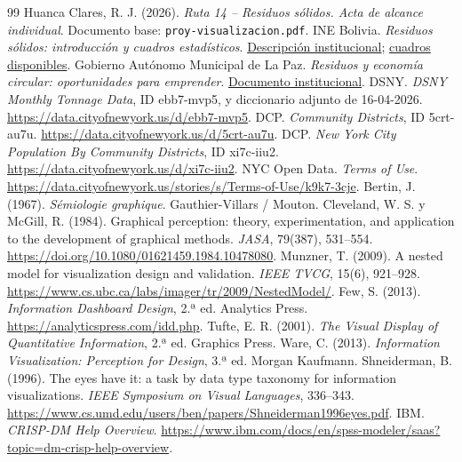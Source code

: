 \documentclass[10pt,a4paper]{article}
\newcommand{\archivo}[1]{\nolinkurl{#1}}
\begin{document}
\newpage
\small
\begin{thebibliography}{99}
\setlength{\itemsep}{3pt}
 Huanca Clares, R. J. (2026). \textit{Ruta 14 -- Residuos sólidos. Acta de alcance individual}. Documento base: \archivo{proy-visualizacion.pdf}.
 INE Bolivia. \textit{Residuos sólidos: introducción y cuadros estadísticos}. \href{https://www.ine.gob.bo/index.php/medio-ambiente/residuos-solidos-introduccion/}{Descripción institucional}; \href{https://www.ine.gob.bo/index.php/medio-ambiente/residuos-solidos-cuadros-estadisticos/}{cuadros disponibles}.
 Gobierno Autónomo Municipal de La Paz. \textit{Residuos y economía circular: oportunidades para emprender}. \href{https://lapaz.bo/wp-content/uploads/2025/01/Residuos-y-economia-circular_-oportunidades-para-emprender-1.pdf}{Documento institucional}.
 DSNY. \textit{DSNY Monthly Tonnage Data}, ID ebb7-mvp5, y diccionario adjunto de 16-04-2026. \url{https://data.cityofnewyork.us/d/ebb7-mvp5}.
 DCP. \textit{Community Districts}, ID 5crt-au7u. \url{https://data.cityofnewyork.us/d/5crt-au7u}.
 DCP. \textit{New York City Population By Community Districts}, ID xi7c-iiu2. \url{https://data.cityofnewyork.us/d/xi7c-iiu2}.
 NYC Open Data. \textit{Terms of Use}. \url{https://data.cityofnewyork.us/stories/s/Terms-of-Use/k9k7-3cje}.
 Bertin, J. (1967). \textit{Sémiologie graphique}. Gauthier-Villars / Mouton.
 Cleveland, W. S. y McGill, R. (1984). Graphical perception: theory, experimentation, and application to the development of graphical methods. \textit{JASA}, 79(387), 531--554. \url{https://doi.org/10.1080/01621459.1984.10478080}.
 Munzner, T. (2009). A nested model for visualization design and validation. \textit{IEEE TVCG}, 15(6), 921--928. \url{https://www.cs.ubc.ca/labs/imager/tr/2009/NestedModel/}.
 Few, S. (2013). \textit{Information Dashboard Design}, 2.ª ed. Analytics Press. \url{https://analyticspress.com/idd.php}.
 Tufte, E. R. (2001). \textit{The Visual Display of Quantitative Information}, 2.ª ed. Graphics Press.
 Ware, C. (2013). \textit{Information Visualization: Perception for Design}, 3.ª ed. Morgan Kaufmann.
 Shneiderman, B. (1996). The eyes have it: a task by data type taxonomy for information visualizations. \textit{IEEE Symposium on Visual Languages}, 336--343. \url{https://www.cs.umd.edu/users/ben/papers/Shneiderman1996eyes.pdf}.
 IBM. \textit{CRISP-DM Help Overview}. \url{https://www.ibm.com/docs/en/spss-modeler/saas?topic=dm-crisp-help-overview}.

\end{thebibliography}
\end{document}
